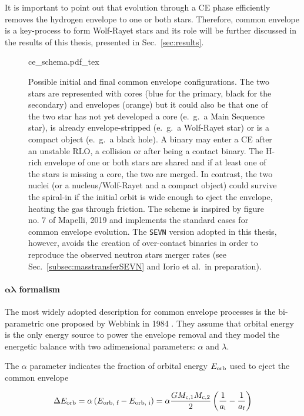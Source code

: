 \documentclass[a4paper,titlepage]{book}     	%
\begin{document}
It is important to point out that evolution through a CE phase efficiently removes the hydrogen envelope to one or both stars. Therefore, common envelope is a key-process to form Wolf-Rayet stars and its role will be further discussed in the results of this thesis, presented in Sec.\ \ref{sec:results}.


\begin{figure}
	\centering
	\def\svgwidth{0.9\textwidth}
	{ce_schema.pdf_tex} 
	\caption{Possible initial and final common envelope configurations. The two stars are represented with cores (blue for the primary, black for the secondary) and envelopes (orange) but it could also be that one of the two star has not yet developed a core (e.\ g.\ a Main Sequence star), is already envelope-stripped (e.\ g.\ a Wolf-Rayet star) or is a compact object (e.\ g.\ a black hole). A binary may enter a CE after an unstable RLO, a collision or after being a contact binary. The H-rich envelope of one or both stars are shared and if at least one of the stars is missing a core, the two are merged. In contrast, the two nuclei (or a nucleus/Wolf-Rayet and a compact object) could survive the spiral-in if the initial orbit is wide enough to eject the envelope, heating the gas through friction. The scheme is inspired by figure no. 7 of Mapelli, 2019 \cite{mapelli} and implements the standard cases for common envelope evolution. The \texttt{SEVN} version adopted in this thesis, however, avoids the creation of over-contact binaries in order to reproduce the observed neutron stars merger rates (see Sec.\ \ref{subsec:masstransferSEVN} and Iorio et al.\ in preparation).}\label{fig:ce_mapelli}
\end{figure}


\paragraph{$\boldsymbol{\alpha \lambda}$ formalism} The most widely adopted description for common envelope processes is the bi-parametric one proposed by Webbink in 1984 \cite{Webbink1984_CE}. They assume that orbital energy is the only energy source to power the envelope removal and they model the energetic balance with two adimensional parameters: $\alpha$ and $\lambda$.

The $\alpha$ parameter indicates the fraction of orbital energy  $E_{\rm orb}$ used to eject the common envelope

\begin{equation}\label{eq:EorbCEalpha}
\Delta E_\textup{orb} = \alpha \left(E_\textup{orb, f} - E_\textup{orb, i}\right) = \alpha \frac{G M_\textup{c,1} M_\textup{c,2}}{2} \left(\frac{1}{a_\textup{i}} - \frac{1}{a_\textup{f}}\right)
\end{equation}
\end{document}
